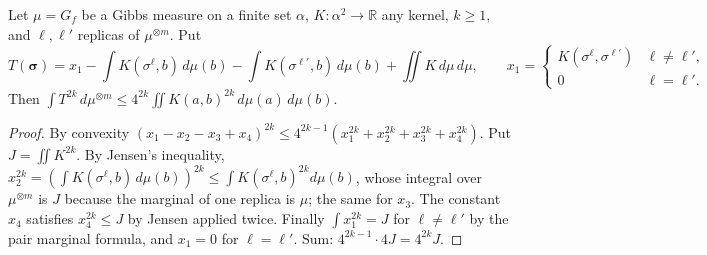 \begin{lemma}
\label{lem:sg-tal:double-centering}
  \leanok
{}
Let $\mu=G_f$ be a Gibbs measure on a finite set $\alpha$, $K:\alpha^2\to\mathbb R$ any kernel, $k\ge1$, and $\ell,\ell'$ replicas of $\mu^{\otimes m}$.  Put
\[
T(\boldsymbol\sigma)=x_1-\int K(\sigma^\ell,b)\,d\mu(b)-\int K(\sigma^{\ell'},b)\,d\mu(b)+\iint K\,d\mu\,d\mu,\qquad x_1=\begin{cases}K(\sigma^\ell,\sigma^{\ell'})&\ell\ne\ell',\\0&\ell=\ell'.\end{cases}
\]
Then $\int T^{2k}\,d\mu^{\otimes m}\le4^{2k}\iint K(a,b)^{2k}\,d\mu(a)\,d\mu(b)$.
\end{lemma}
\begin{proof}
  \leanok
By convexity $(x_1-x_2-x_3+x_4)^{2k}\le4^{2k-1}(x_1^{2k}+x_2^{2k}+x_3^{2k}+x_4^{2k})$.  Put $J=\iint K^{2k}$.  By Jensen's inequality, $x_2^{2k}=(\int K(\sigma^\ell,b)\,d\mu(b))^{2k}\le\int K(\sigma^\ell,b)^{2k}d\mu(b)$, whose integral over $\mu^{\otimes m}$ is $J$ because the marginal of one replica is $\mu$; the same for $x_3$.  The constant $x_4$ satisfies $x_4^{2k}\le J$ by Jensen applied twice.  Finally $\int x_1^{2k}=J$ for $\ell\ne\ell'$ by the pair marginal formula, and $x_1=0$ for $\ell=\ell'$.  Sum: $4^{2k-1}\cdot4J=4^{2k}J$.
\end{proof}

